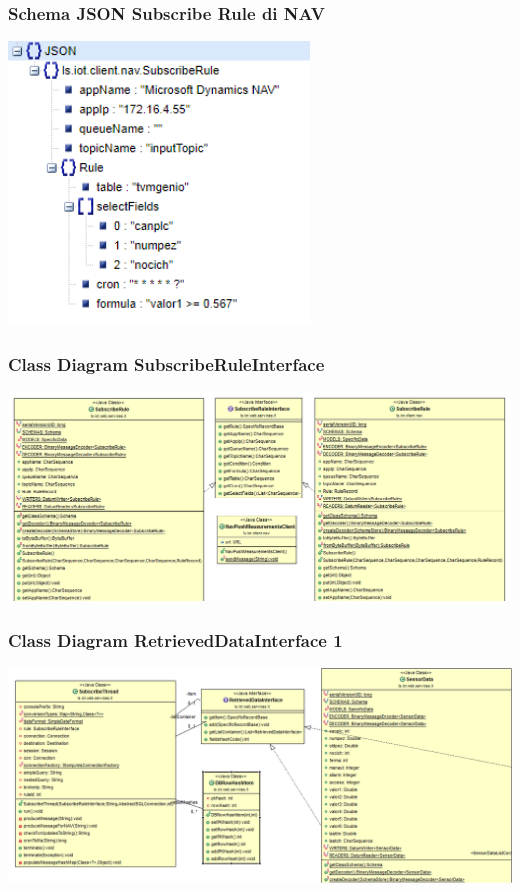 \documentclass{beamer}
\begin{document}
\begin{frame}
\frametitle{Schema JSON Subscribe Rule di NAV}
\includegraphics[width=0.6\textwidth]{images/subscribe-json-2.png}
\end{frame}

\begin{frame}
\frametitle{Class Diagram SubscribeRuleInterface}
\includegraphics[width=1\textwidth]{images/figura10.png}
\end{frame}

\begin{frame}
\frametitle{Class Diagram RetrievedDataInterface 1}
\includegraphics[width=1\textwidth]{images/ClassDiagram2.png}
\end{frame}
\end{document}
